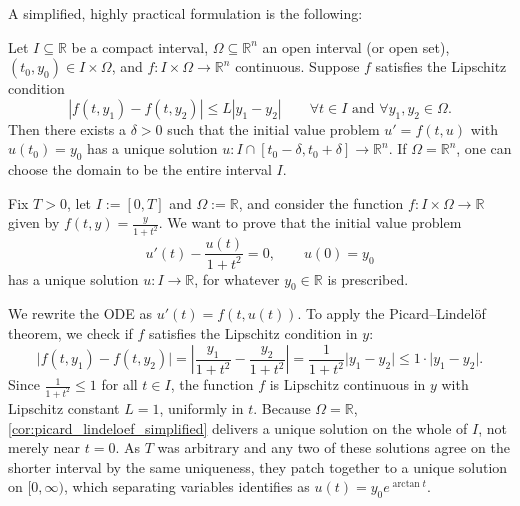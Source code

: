 A simplified, highly practical formulation is the following:
\begin{corollary}
\label{cor:picard_lindeloef_simplified}
Let $I \subseteq \mathbb{R}$ be a compact interval, $\Omega \subseteq \mathbb{R}^n$ an open interval (or open set), $(t_0, y_0) \in I \times \Omega$, and $f: I \times \Omega \to \mathbb{R}^n$ continuous. Suppose $f$ satisfies the Lipschitz condition
\[
|f(t, y_1) - f(t, y_2)| \leq L |y_1 - y_2| \qquad \forall t \in I \text{ and } \forall y_1, y_2 \in \Omega.
\]
Then there exists a $\delta > 0$ such that the initial value problem $u' = f(t, u)$ with $u(t_0) = y_0$ has a unique solution $u: I \cap [t_0-\delta, t_0+\delta] \to \mathbb{R}^n$.
If $\Omega = \mathbb{R}^n$, one can choose the domain to be the entire interval $I$.
\end{corollary}

\begin{example}
\label{ex:picard_lindeloef_application}
Fix $T > 0$, let $I := [0,T]$ and $\Omega := \mathbb{R}$, and consider the function
$f: I \times \Omega \to \mathbb{R}$ given by $f(t, y) = \frac{y}{1+t^2}$. We want to prove that
the initial value problem
\[u'(t) - \frac{u(t)}{1+t^2} = 0, \qquad u(0) = y_0\]
has a unique solution $u : I \to \mathbb{R}$, for whatever $y_0 \in \mathbb{R}$ is prescribed.

We rewrite the ODE as $u'(t) = f(t, u(t))$. To apply the Picard--Lindelöf theorem, we check if $f$ satisfies the Lipschitz condition in $y$:
\[
\lvert f(t, y_1) - f(t, y_2) \rvert = \left\lvert \frac{y_1}{1+t^2} - \frac{y_2}{1+t^2} \right\rvert = \frac{1}{1+t^2} \lvert y_1 - y_2 \rvert \leq 1 \cdot \lvert y_1 - y_2 \rvert.
\]
Since $\frac{1}{1+t^2} \leq 1$ for all $t \in I$, the function $f$ is Lipschitz continuous in $y$
with Lipschitz constant $L=1$, uniformly in $t$. Because $\Omega = \mathbb{R}$,
\cref{cor:picard_lindeloef_simplified} delivers a unique solution on the whole of $I$, not merely
near $t=0$. As $T$ was arbitrary and any two of these solutions agree on the shorter interval by
the same uniqueness, they patch together to a unique solution on $[0,\infty)$, which
separating variables identifies as $u(t) = y_0e^{\arctan t}$.
\end{example}


